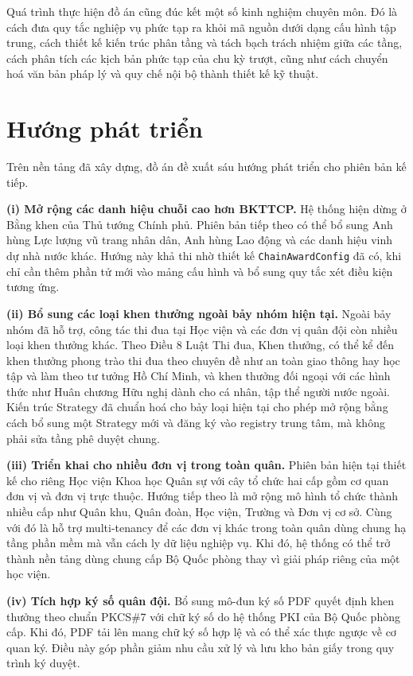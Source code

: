 \documentclass[../DoAn.tex]{subfiles}
\begin{document}
Quá trình thực hiện đồ án cũng đúc kết một số kinh nghiệm chuyên môn. Đó là cách đưa quy tắc nghiệp vụ phức tạp ra khỏi mã nguồn dưới dạng cấu hình tập trung, cách thiết kế kiến trúc phân tầng và tách bạch trách nhiệm giữa các tầng, cách phân tích các kịch bản phức tạp của chu kỳ trượt, cũng như cách chuyển hoá văn bản pháp lý và quy chế nội bộ thành thiết kế kỹ thuật.

\section{Hướng phát triển}
\label{section:6.2}

Trên nền tảng đã xây dựng, đồ án đề xuất sáu hướng phát triển cho phiên bản kế tiếp.

\textbf{(i) Mở rộng các danh hiệu chuỗi cao hơn BKTTCP.} Hệ thống hiện dừng ở Bằng khen của Thủ tướng Chính phủ. Phiên bản tiếp theo có thể bổ sung Anh hùng Lực lượng vũ trang nhân dân, Anh hùng Lao động và các danh hiệu vinh dự nhà nước khác. Hướng này khả thi nhờ thiết kế \texttt{ChainAwardConfig} đã có, khi chỉ cần thêm phần tử mới vào mảng cấu hình và bổ sung quy tắc xét điều kiện tương ứng.

\textbf{(ii) Bổ sung các loại khen thưởng ngoài bảy nhóm hiện tại.} Ngoài bảy nhóm đã hỗ trợ, công tác thi đua tại Học viện và các đơn vị quân đội còn nhiều loại khen thưởng khác. Theo Điều 8 Luật Thi đua, Khen thưởng, có thể kể đến khen thưởng phong trào thi đua theo chuyên đề như an toàn giao thông hay học tập và làm theo tư tưởng Hồ Chí Minh, và khen thưởng đối ngoại với các hình thức như Huân chương Hữu nghị dành cho cá nhân, tập thể người nước ngoài. Kiến trúc Strategy đã chuẩn hoá cho bảy loại hiện tại cho phép mở rộng bằng cách bổ sung một Strategy mới và đăng ký vào registry trung tâm, mà không phải sửa tầng phê duyệt chung.

\textbf{(iii) Triển khai cho nhiều đơn vị trong toàn quân.} Phiên bản hiện tại thiết kế cho riêng Học viện Khoa học Quân sự với cây tổ chức hai cấp gồm cơ quan đơn vị và đơn vị trực thuộc. Hướng tiếp theo là mở rộng mô hình tổ chức thành nhiều cấp như Quân khu, Quân đoàn, Học viện, Trường và Đơn vị cơ sở. Cùng với đó là hỗ trợ multi-tenancy để các đơn vị khác trong toàn quân dùng chung hạ tầng phần mềm mà vẫn cách ly dữ liệu nghiệp vụ. Khi đó, hệ thống có thể trở thành nền tảng dùng chung cấp Bộ Quốc phòng thay vì giải pháp riêng của một học viện.

\textbf{(iv) Tích hợp ký số quân đội.} Bổ sung mô-đun ký số PDF quyết định khen thưởng theo chuẩn PKCS\#7 với chữ ký số do hệ thống PKI của Bộ Quốc phòng cấp. Khi đó, PDF tải lên mang chữ ký số hợp lệ và có thể xác thực ngược về cơ quan ký. Điều này góp phần giảm nhu cầu xử lý và lưu kho bản giấy trong quy trình ký duyệt.
\end{document}
